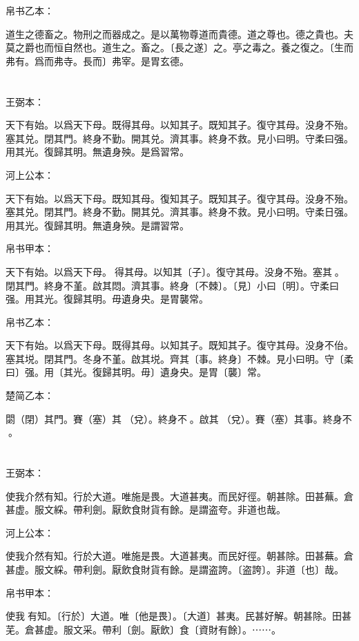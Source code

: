 \documentclass[a5paper]{ctexbook}
\begin{document}
    帛书乙本：

    道生之德畜之。物刑之而器成之。是以萬物尊道而貴德。道之尊也。德之貴也。夫莫之爵也而恒自然也。道生之。畜之。〔長之遂〕之。亭之毒之。養之復之。〔生而弗有。爲而弗寺。長而〕弗宰。是胃玄德。

    \chapter{}
    王弼本：

    天下有始。以爲天下母。既得其母。以知其子。既知其子。復守其母。没身不殆。塞其兑。閉其門。終身不勤。開其兑。濟其事。終身不救。見小曰明。守柔曰强。用其光。復歸其明。無遺身殃。是爲習常。

    河上公本：

    天下有始。以爲天下母。既知其母。復知其子。既知其子。復守其母。没身不殆。塞其兑。閉其門。終身不勤。開其兑。濟其事。終身不救。見小曰明。守柔日强。用其光。復歸其明。無遺身殃。是謂習常。

    帛书甲本：

    天下有始。以爲天下母。𢟪得其母。以知其〔子〕。復守其母。没身不殆。塞其󱁂。閉其門。終身不堇。啟其悶。濟其事。終身〔不棘〕。〔見〕小曰〔明〕。守柔曰强。用其光。復歸其明。毋遺身央。是胃襲常。

    帛书乙本：

    天下有始。以爲天下母。既得其母。以知其子。既知其子。復守其母。没身不佁。塞其㙂。閉其門。冬身不堇。啟其㙂。齊其〔事。終身〕不棘。見小曰明。守〔柔曰〕强。用〔其光。復歸其明。毋〕遺身央。是胃〔襲〕常。

    楚简乙本：

    閟（閉）其門。賽（塞）其𨓚（兌）。終身不󼲆。啟其𨓚（兌）。賽（塞）其事。終身不󶵠。

    \chapter{}
    王弼本：

    使我介然有知。行於大道。唯施是畏。大道甚夷。而民好徑。朝甚除。田甚蕪。倉甚虚。服文綵。帶利劍。厭飲食財貨有餘。是謂盗夸。非道也哉。

    河上公本：

    使我介然有知。行於大道。唯施是畏。大道甚夷。而民好徑。朝甚除。田甚蕪。倉甚虚。服文綵。帶利劍。厭飲食財貨有餘。是謂盗誇。〔盗誇〕。非道〔也〕哉。

    帛书甲本：

    使我𢴲有知。〔行於〕大道。唯〔他是畏〕。〔大道〕甚夷。民甚好解。朝甚除。田甚芜。倉甚虚。服文采。帶利〔劍。厭飲〕食〔資財有餘〕。⋯⋯。
\end{document}
